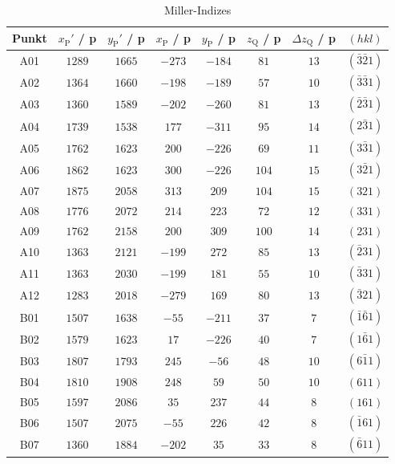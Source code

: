 \begin{table}[H]
    \centering
    \caption{Miller-Indizes}
    \begin{tabular}{c|c|c|c|c|c|c|c}
        Punkt & $x_{\mathrm{P}}'$ / p & $y_{\mathrm{P}}'$ / p & $x_{\mathrm{P}}$ / p & $y_{\mathrm{P}}$ / p & $z_{\mathrm{Q}}$ / p & $\Delta z_{\mathrm{Q}}$ / p & $(hkl)$ \\
        \hline
        A01 & $1289$ & $1665$ & $-273$ & $-184$ & $ 81$ & $13$ & $(\bar{3}\bar{2}1)$ \\
        A02 & $1364$ & $1660$ & $-198$ & $-189$ & $ 57$ & $10$ & $(\bar{3}\bar{3}1)$ \\
        A03 & $1360$ & $1589$ & $-202$ & $-260$ & $ 81$ & $13$ & $(\bar{2}\bar{3}1)$ \\
        A04 & $1739$ & $1538$ & $ 177$ & $-311$ & $ 95$ & $14$ & $(2\bar{3}1)$ \\
        A05 & $1762$ & $1623$ & $ 200$ & $-226$ & $ 69$ & $11$ & $(3\bar{3}1)$ \\
        A06 & $1862$ & $1623$ & $ 300$ & $-226$ & $104$ & $15$ & $(3\bar{2}1)$ \\
        A07 & $1875$ & $2058$ & $ 313$ & $ 209$ & $104$ & $15$ & $(321)$ \\
        A08 & $1776$ & $2072$ & $ 214$ & $ 223$ & $ 72$ & $12$ & $(331)$ \\
        A09 & $1762$ & $2158$ & $ 200$ & $ 309$ & $100$ & $14$ & $(231)$ \\
        A10 & $1363$ & $2121$ & $-199$ & $ 272$ & $ 85$ & $13$ & $(\bar{2}31)$ \\
        A11 & $1363$ & $2030$ & $-199$ & $ 181$ & $ 55$ & $10$ & $(\bar{3}31)$ \\
        A12 & $1283$ & $2018$ & $-279$ & $ 169$ & $ 80$ & $13$ & $(\bar{3}21)$ \\
        B01 & $1507$ & $1638$ & $ -55$ & $-211$ & $ 37$ & $ 7$ & $(\bar{1}\bar{6}1)$ \\
        B02 & $1579$ & $1623$ & $  17$ & $-226$ & $ 40$ & $ 7$ & $(1\bar{6}1)$ \\
        B03 & $1807$ & $1793$ & $ 245$ & $ -56$ & $ 48$ & $10$ & $(6\bar{1}1)$ \\
        B04 & $1810$ & $1908$ & $ 248$ & $  59$ & $ 50$ & $10$ & $(611)$ \\
        B05 & $1597$ & $2086$ & $  35$ & $ 237$ & $ 44$ & $ 8$ & $(161)$ \\
        B06 & $1507$ & $2075$ & $ -55$ & $ 226$ & $ 42$ & $ 8$ & $(\bar{1}61)$ \\
        B07 & $1360$ & $1884$ & $-202$ & $  35$ & $ 33$ & $ 8$ & $(\bar{6}11)$ \\

\end{tabular}
\end{table}
